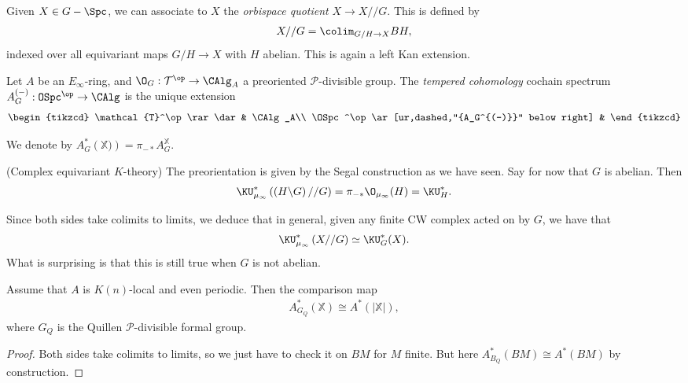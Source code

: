 Given $X\in G-\Spc$, we can associate to $X$ the \textit{orbispace quotient} $X \to X//G$. This is defined by
\begin{align*}
    X//G = \colim_{G/H \to X} BH,
\end{align*}
indexed over all equivariant maps $G/H \to X$ with $H$ abelian. This is again a left Kan extension.

\begin{definition} Let $A$ be an $E_\infty$-ring, and $\O_G: \mathcal{T}^\op \to \CAlg_A$ a preoriented $\mathcal{P}$-divisible group. The \textit{tempered cohomology} cochain spectrum $A_G^{(-)} : \OSpc^\op \to \CAlg$ is the unique extension
\[ \begin{tikzcd}
    \mathcal{T}^\op\rar\dar & \CAlg_A\\
    \OSpc^\op\ar[ur,dashed,"{A_G^{(-)}}" below right] & 
\end{tikzcd} \]
\end{definition}

\begin{notation} We denote by $A_G^\ast \left( \mathbb{X}) \right) = \pi_{- \ast} A_G^{\mathbb{X}}$.
\end{notation}

\begin{example} (Complex equivariant $K$-theory) The preorientation is given by the Segal construction as we have seen. Say for now that $G$ is abelian. Then
\begin{align*}
    \KU_{\mu_\infty}^\ast \left( \left( H\backslash G \right)//G \right) = \pi_{- \ast} \O_{\mu_\infty}(H) = \KU_H^\ast.
\end{align*}
\end{example}
Since both sides take colimits to limits, we deduce that in general, given any finite CW complex acted on by $G$, we have that
\begin{align*}
    \KU_{\mu_\infty}^\ast \left( X//G \right) \simeq \KU_G^\ast(X).
\end{align*}
What is surprising is that this is still true when $G$ is not abelian.


\begin{theorem} Assume that $A$ is $K(n)$-local and even periodic. Then the comparison map
\begin{align*}
    A^\ast_{G_Q} \left( \mathbb{X} \right) \cong A^\ast \left( |\mathbb{X}| \right),
\end{align*}
where $G_Q$ is the Quillen $\mathcal{P}$-divisible formal group.
\end{theorem}
\begin{proof} Both sides take colimits to limits, so we just have to check it on $BM$ for $M$ finite. But here $A^\ast_{B_Q}(BM) \cong A^\ast(BM)$ by construction.
\end{proof}

